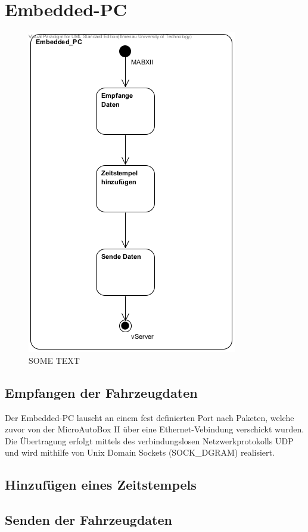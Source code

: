 \documentclass[fontsize = 12pt, paper = a4]{scrreprt}
\begin{document}
\section{Embedded-PC}

\begin{figure}[h]
\centering
\includegraphics[scale = 0.70]{activity_embedded_pc.png}
\caption{SOME TEXT}
\end{figure} 

\subsection{Empfangen der Fahrzeugdaten}

Der Embedded-PC lauscht an einem fest definierten Port nach Paketen, welche zuvor von der MicroAutoBox II über eine Ethernet-Vebindung verschickt wurden. Die Übertragung erfolgt mittels des verbindungslosen Netzwerkprotokolls UDP und wird mithilfe von Unix Domain Sockets (SOCK\_DGRAM) realisiert. 

\subsection{Hinzufügen eines Zeitstempels}

\subsection{Senden der Fahrzeugdaten}
\end{document}
